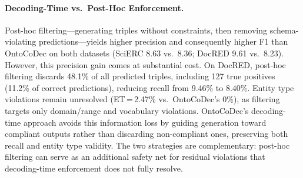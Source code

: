 \paragraph{Decoding-Time vs.\ Post-Hoc Enforcement.}
Post-hoc filtering---generating triples without constraints, then removing schema-violating predictions---yields higher precision and consequently higher F1 than OntoCoDec on both datasets (SciERC 8.63 vs.\ 8.36; DocRED 9.61 vs.\ 8.23).
However, this precision gain comes at substantial cost.
On DocRED, post-hoc filtering discards 48.1\% of all predicted triples, including 127 true positives (11.2\% of correct predictions), reducing recall from 9.46\% to 8.40\%.
Entity type violations remain unresolved (ET\,=\,2.47\% vs.\ OntoCoDec's 0\%), as filtering targets only domain/range and vocabulary violations.
OntoCoDec's decoding-time approach avoids this information loss by guiding generation toward compliant outputs rather than discarding non-compliant ones, preserving both recall and entity type validity.
The two strategies are complementary: post-hoc filtering can serve as an additional safety net for residual violations that decoding-time enforcement does not fully resolve.
